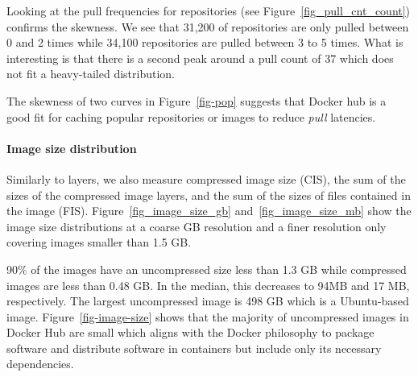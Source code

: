 Looking at the pull frequencies for repositories (see Figure~\ref{fig_pull_cnt_count})
confirms the skewness. We see that 31,200 of repositories are only pulled between 0 and
2 times while 34,100 repositories are pulled between 3 to 5 times. What is interesting is
that there is a second peak around a pull count of 37 which does not fit a heavy-tailed
distribution.


The skewness of two curves in Figure~\ref{fig-pop} suggests that Docker hub is
a good fit for caching popular repositories or images to
reduce \textit{pull} latencies.


\paragraph{Image size distribution}
\label{sec:image-size}





Similarly to layers, we also measure compressed image size
(CIS), \ie the sum of the sizes of the compressed image layers, and the sum of the
sizes of files contained in the image (FIS). Figure~\ref{fig_image_size_gb}
and~\ref{fig_image_size_mb} show the image size distributions at a coarse GB resolution
and a finer resolution only covering images smaller than 1.5 GB.

90\% of the images have an uncompressed size less than 1.3 GB while compressed images
are less than 0.48 GB. In the median, this decreases to 94MB and 17 MB, respectively.
The largest uncompressed image is 498 GB which is a Ubuntu-based image.
Figure~\ref{fig-image-size} shows that the majority of uncompressed images in Docker Hub are
small which aligns with the Docker philosophy to package software and distribute
software in containers but include only its necessary dependencies.


